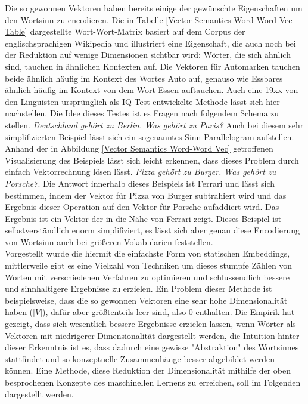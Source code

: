 Die so gewonnen Vektoren haben bereits einige der gewünschte Eigenschaften um den Wortsinn zu encodieren. Die in Tabelle \ref{Vector Semantics Word-Word Vec Table} dargestellte Wort-Wort-Matrix basiert auf dem Corpus der englischsprachigen Wikipedia und illustriert eine Eigenschaft, die auch noch bei der Reduktion auf wenige Dimensionen sichtbar wird: Wörter, die sich ähnlich sind, tauchen in ähnlichen Kontexten auf. Die Vektoren für Automarken tauchen beide ähnlich häufig im Kontext des Wortes Auto auf, genauso wie Essbares ähnlich häufig im Kontext von dem Wort Essen auftauchen. Auch eine 19xx von den Linguisten ursprünglich als IQ-Test entwickelte Methode lässt sich hier nachstellen. Die Idee dieses Testes ist es Fragen nach folgendem Schema zu stellen. \emph{Deutschland gehört zu Berlin. Was gehört zu Paris?} Auch bei diesem sehr simplifizierten Beispiel lässt sich ein sogenanntes Sinn-Parallelogram aufstellen. Anhand der in Abbildung \ref{Vector Semantics Word-Word Vec} getroffenen Visualisierung des Beispiels lässt sich leicht erkennen, dass dieses Problem durch einfach Vektorrechnung lösen lässt. \emph{Pizza gehört zu Burger. Was gehört zu Porsche?}. Die Antwort innerhalb dieses Beispiels ist Ferrari und lässt sich bestimmen, indem der Vektor für Pizza von Burger subtrahiert wird und das Ergebnis dieser Operation auf den Vektor für Porsche aufaddiert wird. Das Ergebnis ist ein Vektor der in die Nähe von Ferrari zeigt. Dieses Beispiel ist selbstverständlich enorm simplifiziert, es lässt sich aber genau diese Encodierung von Wortsinn auch bei größeren Vokabularien feststellen. \\

Vorgestellt wurde die hiermit die einfachste Form von statischen Embeddings, mittlerweile gibt es eine Vielzahl von Techniken um dieses stumpfe Zählen von Worten mit verschiedenen Verfahren zu optimieren und schlussendlich bessere und sinnhaltigere Ergebnisse zu erzielen. Ein Problem dieser Methode ist beispielsweise, dass die so gewonnen Vektoren eine sehr hohe Dimensionalität haben ($|V|$), dafür aber größtenteils leer sind, also 0 enthalten. Die Empirik hat gezeigt, dass sich wesentlich bessere Ergebnisse erzielen lassen, wenn Wörter als Vektoren mit niedrigerer Dimensionalität dargestellt werden, die Intuition hinter dieser Erkenntnis ist es, dass dadurch eine gewisse "Abstraktion" des Wortsinnes stattfindet und so konzeptuelle Zusammenhänge besser abgebildet werden können. Eine Methode, diese Reduktion der Dimensionalität mithilfe der oben besprochenen Konzepte des maschinellen Lernens zu erreichen, soll im Folgenden dargestellt werden.